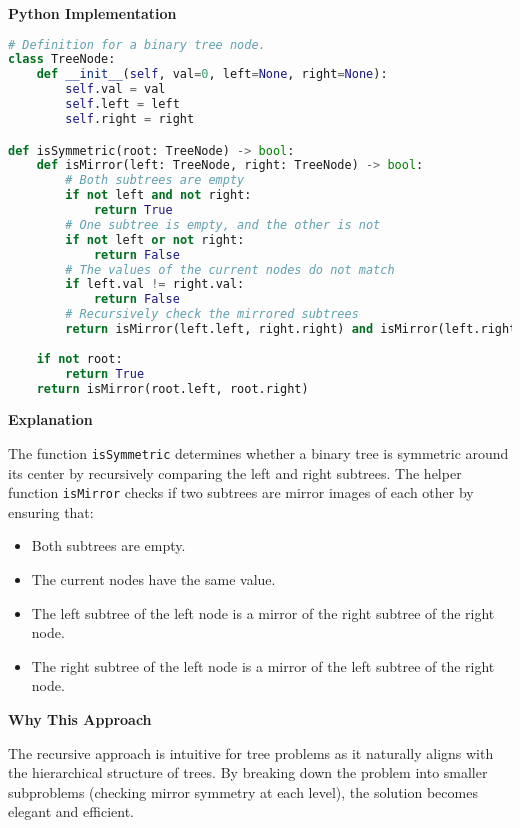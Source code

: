 \textbf{Python Implementation}

\begin{lstlisting}[language=Python, xleftmargin=0.02\textwidth, xrightmargin=0.02\textwidth]
# Definition for a binary tree node.
class TreeNode:
    def __init__(self, val=0, left=None, right=None):
        self.val = val
        self.left = left
        self.right = right

def isSymmetric(root: TreeNode) -> bool:
    def isMirror(left: TreeNode, right: TreeNode) -> bool:
        # Both subtrees are empty
        if not left and not right:
            return True
        # One subtree is empty, and the other is not
        if not left or not right:
            return False
        # The values of the current nodes do not match
        if left.val != right.val:
            return False
        # Recursively check the mirrored subtrees
        return isMirror(left.left, right.right) and isMirror(left.right, right.left)
    
    if not root:
        return True
    return isMirror(root.left, root.right)
\end{lstlisting}

\textbf{Explanation}

The function \texttt{isSymmetric} determines whether a binary tree is symmetric around its center by recursively comparing the left and right subtrees. The helper function \texttt{isMirror} checks if two subtrees are mirror images of each other by ensuring that:

\begin{itemize}
    \item Both subtrees are empty.
    \item The current nodes have the same value.
    \item The left subtree of the left node is a mirror of the right subtree of the right node.
    \item The right subtree of the left node is a mirror of the left subtree of the right node.
\end{itemize}

\textbf{Why This Approach}

The recursive approach is intuitive for tree problems as it naturally aligns with the hierarchical structure of trees. By breaking down the problem into smaller subproblems (checking mirror symmetry at each level), the solution becomes elegant and efficient.


